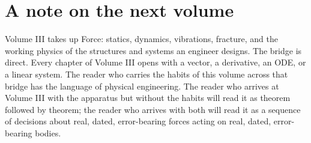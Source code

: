 \section*{A note on the next volume}

Volume III takes up Force: statics, dynamics, vibrations, fracture, and the working physics of the structures and systems an engineer designs. The bridge is direct. Every chapter of Volume III opens with a vector, a derivative, an ODE, or a linear system. The reader who carries the habits of this volume across that bridge has the language of physical engineering. The reader who arrives at Volume III with the apparatus but without the habits will read it as theorem followed by theorem; the reader who arrives with both will read it as a sequence of decisions about real, dated, error-bearing forces acting on real, dated, error-bearing bodies.

\vspace{1cm}
